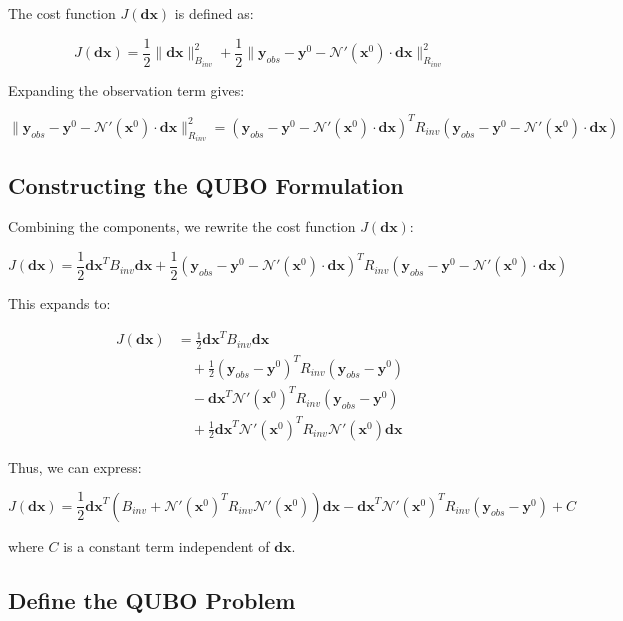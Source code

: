 \documentclass{article}
\begin{document}
The cost function \( J(\mathbf{dx}) \) is defined as:

\[
J(\mathbf{dx}) = \frac{1}{2} \|\mathbf{dx}\|^2_{B_{inv}} + \frac{1}{2} \|\mathbf{y}_{obs} - \mathbf{y}^0 - \mathcal{N}'(\mathbf{x}^0) \cdot \mathbf{dx}\|^2_{R_{inv}}
\]

Expanding the observation term gives:

\[
\|\mathbf{y}_{obs} - \mathbf{y}^0 - \mathcal{N}'(\mathbf{x}^0) \cdot \mathbf{dx}\|^2_{R_{inv}} = (\mathbf{y}_{obs} - \mathbf{y}^0 - \mathcal{N}'(\mathbf{x}^0) \cdot \mathbf{dx})^T R_{inv} (\mathbf{y}_{obs} - \mathbf{y}^0 - \mathcal{N}'(\mathbf{x}^0) \cdot \mathbf{dx})
\]

\subsection{Constructing the QUBO Formulation}

Combining the components, we rewrite the cost function \( J(\mathbf{dx}) \):

\[
J(\mathbf{dx}) = \frac{1}{2} \mathbf{dx}^T B_{inv} \mathbf{dx} + \frac{1}{2} (\mathbf{y}_{obs} - \mathbf{y}^0 - \mathcal{N}'(\mathbf{x}^0) \cdot \mathbf{dx})^T R_{inv} (\mathbf{y}_{obs} - \mathbf{y}^0 - \mathcal{N}'(\mathbf{x}^0) \cdot \mathbf{dx})
\]

This expands to:


\begin{align*}
J(\mathbf{dx}) &= \frac{1}{2} \mathbf{dx}^T B_{inv} \mathbf{dx} \\
&\quad + \frac{1}{2} (\mathbf{y}_{obs} - \mathbf{y}^0)^T R_{inv} (\mathbf{y}_{obs} - \mathbf{y}^0) \\
&\quad - \mathbf{dx}^T \mathcal{N}'(\mathbf{x}^0)^T R_{inv} (\mathbf{y}_{obs} - \mathbf{y}^0) \\
&\quad + \frac{1}{2} \mathbf{dx}^T \mathcal{N}'(\mathbf{x}^0)^T R_{inv} \mathcal{N}'(\mathbf{x}^0) \mathbf{dx}
\end{align*}

Thus, we can express:

\[
J(\mathbf{dx}) = \frac{1}{2} \mathbf{dx}^T \left( B_{inv} + \mathcal{N}'(\mathbf{x}^0)^T R_{inv} \mathcal{N}'(\mathbf{x}^0) \right) \mathbf{dx} - \mathbf{dx}^T \mathcal{N}'(\mathbf{x}^0)^T R_{inv} (\mathbf{y}_{obs} - \mathbf{y}^0) + C
\]

where \( C \) is a constant term independent of \( \mathbf{dx} \).

\subsection{Define the QUBO Problem}
\end{document}
